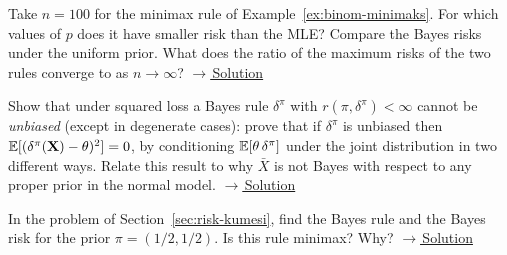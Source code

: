 \documentclass[main.tex]{subfiles}
\begin{document}
\begin{exercise}\label{exr:20-2}
Take $n=100$ for the minimax rule of Example~\ref{ex:binom-minimaks}. For which values of $p$ does it have smaller risk than the MLE? Compare the Bayes risks under the uniform prior. What does the ratio of the maximum risks of the two rules converge to as $n\to\infty$?
\hfill\hyperref[coz:20-2]{\footnotesize$\rightarrow$\,Solution}
\end{exercise}

\begin{exercise}\label{exr:20-3}
Show that under squared loss a Bayes rule $\delta^\pi$ with $r(\pi,\delta^\pi)<\infty$ cannot be \emph{unbiased} (except in degenerate cases): prove that if $\delta^\pi$ is unbiased then $\mathbb{E}[(\delta^\pi(\mathbf{X})-\theta)^2]=0$, by conditioning $\mathbb{E}[\theta\,\delta^\pi]$ under the joint distribution in two different ways. Relate this result to why $\bar X$ is not Bayes with respect to any proper prior in the normal model.
\hfill\hyperref[coz:20-3]{\footnotesize$\rightarrow$\,Solution}
\end{exercise}

\begin{exercise}\label{exr:20-4}
In the problem of Section~\ref{sec:risk-kumesi}, find the Bayes rule and the Bayes risk for the prior $\pi=(1/2,1/2)$. Is this rule minimax? Why?
\hfill\hyperref[coz:20-4]{\footnotesize$\rightarrow$\,Solution}
\end{exercise}

\end{document}
